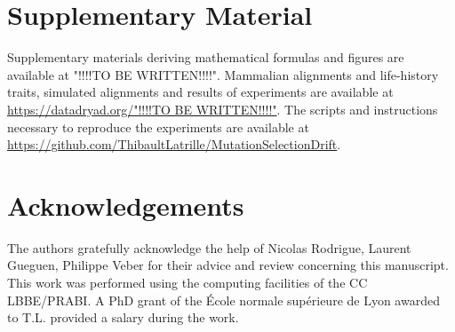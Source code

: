 \documentclass[a4paper]{MBE}
\begin{document}


\section{Supplementary Material}
Supplementary materials deriving mathematical formulas and figures are available at "!!!!TO BE WRITTEN!!!!".
Mammalian alignments and life-history traits, simulated alignments and results of experiments are available at \url{https://datadryad.org/"!!!!TO BE WRITTEN!!!!"}.
The scripts and instructions necessary to reproduce the experiments are available at \url{https://github.com/ThibaultLatrille/MutationSelectionDrift}.

\section{Acknowledgements}
The authors gratefully acknowledge the help of Nicolas Rodrigue, Laurent Gueguen, Philippe Veber for their advice and review concerning this manuscript.
This work was performed using the computing facilities of the CC LBBE/PRABI.
A PhD grant of the École normale supérieure de Lyon awarded to T.L.
provided a salary during the work.


\end{document}
